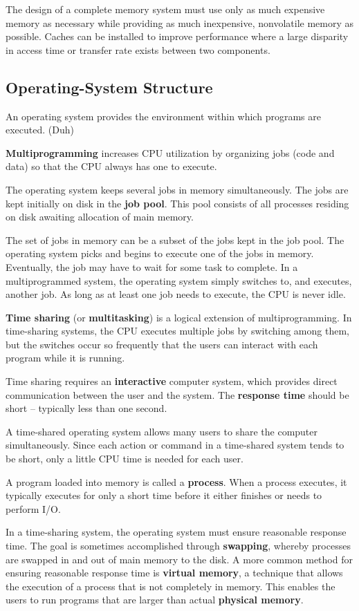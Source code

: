 \documentclass[]{article}
\begin{document}
The design of a complete memory system must use only as much expensive memory as
necessary while providing as much inexpensive, nonvolatile memory as possible.
Caches can be installed to improve performance where a large disparity in access
time or transfer rate exists between two components.

\subsection*{Operating-System Structure}
An operating system provides the environment within which programs are executed.
(Duh)

\textbf{Multiprogramming} increases CPU utilization by organizing jobs (code and
data) so that the CPU always has one to execute.

The operating system keeps several jobs in memory simultaneously. The jobs are
kept initially on disk in the \textbf{job pool}. This pool consists of all
processes residing on disk awaiting allocation of main memory.

The set of jobs in memory can be a subset of the jobs kept in the job pool. The
operating system picks and begins to execute one of the jobs in memory.
Eventually, the job may have to wait for some task to complete. In a
multiprogrammed system, the operating system simply switches to, and executes,
another job. As long as at least one job needs to execute, the CPU is never
idle.

\textbf{Time sharing} (or \textbf{multitasking}) is a logical extension of
multiprogramming. In time-sharing systems, the CPU executes multiple jobs by
switching among them, but the switches occur so frequently that the users can
interact with each program while it is running.

Time sharing requires an \textbf{interactive} computer system, which provides
direct communication between the user and the system. The \textbf{response time}
should be short -- typically less than one second.

A time-shared operating system allows many users to share the computer
simultaneously. Since each action or command in a time-shared system tends to be
short, only a little CPU time is needed for each user.

A program loaded into memory is called a \textbf{process}. When a process
executes, it typically executes for only a short time before it either finishes
or needs to perform I/O.

In a time-sharing system, the operating system must ensure reasonable response
time. The goal is sometimes accomplished through \textbf{swapping}, whereby
processes are swapped in and out of main memory to the disk. A more common
method for ensuring reasonable response time is \textbf{virtual memory}, a
technique that allows the execution of a process that is not completely in
memory. This enables the users to run programs that are larger than actual
\textbf{physical memory}.
\end{document}
